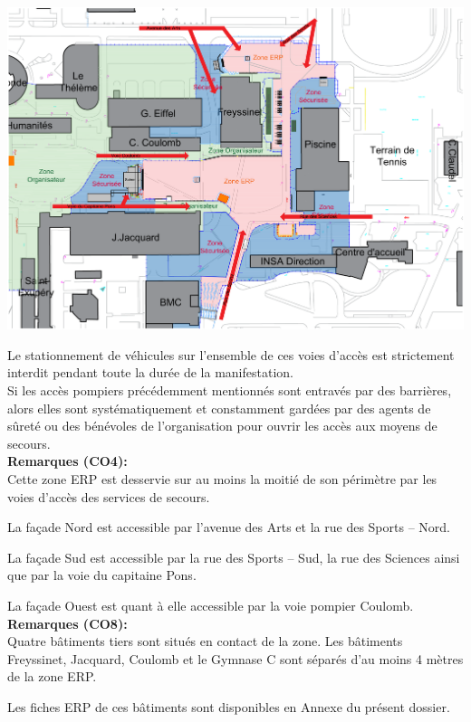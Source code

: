 \documentclass[hidelinks, paper=a4, fontsize=13pt]{report}
\begin{document}
\begin{center}
	\includegraphics[width=.8\textwidth,keepaspectratio]{Exports/Plan_24h_44eme-Acces_Pompiers}
\end{center}

Le stationnement de véhicules sur l’ensemble de ces voies d’accès est strictement interdit pendant toute la durée de la manifestation. \\

Si les accès pompiers précédemment mentionnés sont entravés par des barrières, alors elles sont systématiquement et constamment gardées par des agents de sûreté ou des bénévoles de l’organisation pour ouvrir les accès aux moyens de secours.\\

\textbf{Remarques (CO4): }\\
Cette zone ERP est desservie sur au moins la moitié de son périmètre par les voies d’accès des services de secours. 

La façade Nord est accessible par l’avenue des Arts et la rue des Sports – Nord. 

La façade Sud est accessible par la rue des Sports – Sud, la rue des Sciences ainsi que par la voie du capitaine Pons. 

La façade Ouest est quant à elle accessible par la voie pompier Coulomb.\\


\textbf{Remarques (CO8): }\\
Quatre bâtiments tiers sont situés en contact de la zone. Les bâtiments Freyssinet, Jacquard, Coulomb et le Gymnase C sont séparés d’au moins 4 mètres de la zone ERP. 

Les fiches ERP de ces bâtiments sont disponibles en Annexe du présent dossier. 
\end{document}
